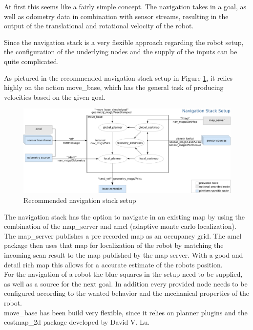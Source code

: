 At first this seems like a fairly simple concept. The navigation takes in a goal, as well as odometry data in combination with sensor streams, resulting in the output of the translational and rotational velocity of the robot.

Since the navigation stack is a very flexible approach regarding the robot setup, the configuration of the underlying nodes and the supply of the inputs can be quite complicated\cite{nav}.

As pictured in the recommended navigation stack setup in Figure \ref{navigation stack setup}, it relies highly on the action move\_base, which has the general task of producing velocities based on the given goal.

\begin{figure} 
	\centering
	\includegraphics[width=\textwidth]{Pictures/navigation stack setup}
	\caption{Recommended navigation stack setup\cite{movebase}}
	
	\label{navigation stack setup}
\end{figure}

The navigation stack has the option to navigate in an existing map by using the combination of the map\_server and amcl (adaptive monte carlo localization). The map\_server publishes a pre recorded map as an occupancy grid. The amcl package then uses that map for localization of the robot by matching the incoming scan result to the map published by the map server. With a good and detail rich map this allows for a accurate estimate of the robots position.\\

For the navigation of a robot the blue squares in the setup need to be supplied, as well as a source for the next goal. In addition every provided node needs to be configured according to the wanted behavior and the mechanical properties of the robot.\\

move\_base has been build very flexible, since it relies on planner plugins and the costmap\_2d package developed by David V. Lu.

